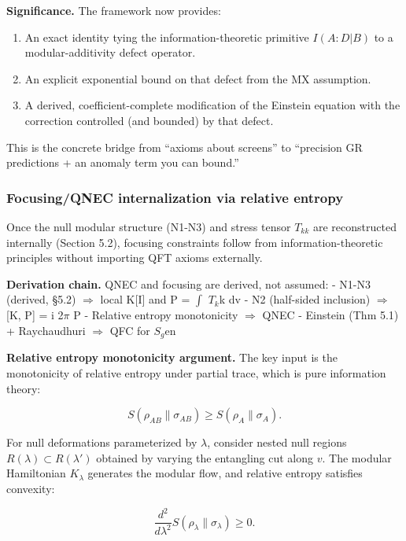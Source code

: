 \documentclass[11pt,a4paper]{article}
\theoremstyle{remark}
\providecommand{\tightlist}{%
  \setlength{\itemsep}{0pt}\setlength{\parskip}{0pt}}
\begin{document}
\textbf{Significance.} The framework now provides:

\begin{enumerate}
\def\labelenumi{\arabic{enumi}.}
\tightlist
\item
  An exact identity tying the information-theoretic primitive \(I(A:D|B)\) to a
  modular-additivity defect operator.
\item
  An explicit exponential bound on that defect from the MX assumption.
\item
  A derived, coefficient-complete modification of the Einstein equation with
  the correction controlled (and bounded) by that defect.
\end{enumerate}

This is the concrete bridge from ``axioms about screens'' to ``precision GR
predictions + an anomaly term you can bound.''

\subsubsection{Focusing/QNEC internalization via relative entropy}\label{focusingqnec-internalization-via-relative-entropy}

Once the null modular structure (N1-N3) and stress tensor \(T_{kk}\) are
reconstructed internally (Section 5.2), focusing constraints follow from
information-theoretic principles without importing QFT axioms externally.

\textbf{Derivation chain.} QNEC and focusing are derived, not assumed:
- N1-N3 (derived, §5.2) \ensuremath{\Longrightarrow} local K{[}I{]} and P = \ensuremath{\int} \(T_k\)k dv
- N2 (half-sided inclusion) \ensuremath{\Longrightarrow} {[}K, P{]} = i 2\ensuremath{\pi} P
- Relative entropy monotonicity \ensuremath{\Longrightarrow} QNEC
- Einstein (Thm 5.1) + Raychaudhuri \ensuremath{\Longrightarrow} QFC for \(S_g\)en

\textbf{Relative entropy monotonicity argument.} The key input is the monotonicity
of relative entropy under partial trace, which is pure information theory:

\[
S(\rho_{AB} \| \sigma_{AB}) \ge S(\rho_A \| \sigma_A).
\]

For null deformations parameterized by \(\lambda\), consider nested null regions
\(R(\lambda) \subset R(\lambda')\) obtained by varying the entangling cut along
\(v\). The modular Hamiltonian \(K_\lambda\) generates the modular flow, and
relative entropy satisfies convexity:

\[
\frac{d^2}{d\lambda^2} S(\rho_\lambda \| \sigma_\lambda) \ge 0.
\]
\end{document}

